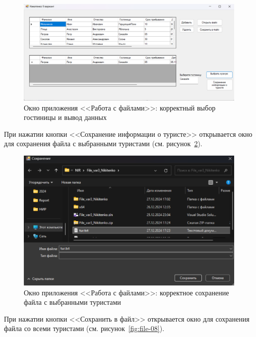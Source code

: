 \documentclass[bachelor, och, pract, times]{SCWorks}
\begin{document}
\begin{figure}[H]
    \centering
    \includegraphics[scale=0.45]{Скрины/Снимок экрана 2025-01-05 142342.png}
    \caption{Окно приложения <<Работа с файлами>>: корректный выбор гостиницы и вывод данных}\label{fig:file-06}
\end{figure}

При нажатии кнопки <<Сохранение информации о туристе>> открывается окно для сохранения файла с выбранными туристами (см. рисунок~\ref{fig:file-07}).

\begin{figure}[H]
    \centering
    \includegraphics[scale=0.45]{Скрины/Снимок экрана 2025-01-05 142412.png}
    \caption{Окно приложения <<Работа с файлами>>: корректное сохранение файла с выбранными туристами}\label{fig:file-07}
\end{figure}

При нажатии кнопки <<Сохранить в файл>> открывается окно для сохранения файла со всеми туристами (см. рисунок~\ref{fig:file-08}).
\end{document}
